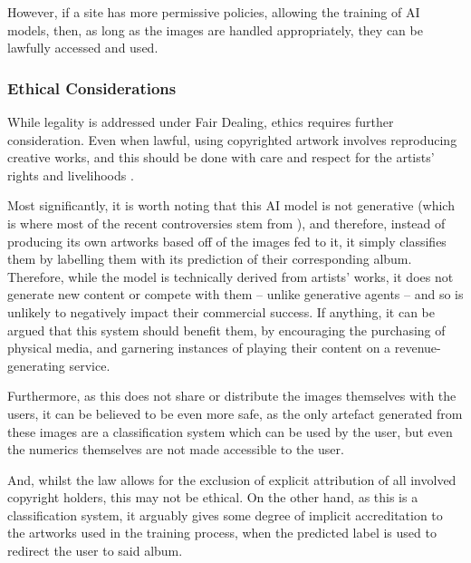                   However, if a site has more permissive policies, allowing the training of AI models, then, as long as the images are handled appropriately, they can be lawfully accessed and used.
    
              \subsubsection{Ethical Considerations}
    
                  While legality is addressed under Fair Dealing, ethics requires further consideration. Even when lawful, using copyrighted artwork involves reproducing creative works, and this should be done with care and respect for the artists' rights and livelihoods \cite{heikkila2022ai_art}.
    
                  Most significantly, it is worth noting that this AI model is not generative (which is where most of the recent controversies stem from \cite{apnews2025mccartney_ai_warning}), and therefore, instead of producing its own artworks based off of the images fed to it, it simply classifies them by labelling them with its prediction of their corresponding album. Therefore, while the model is technically derived from artists' works, it does not generate new content or compete with them -- unlike generative agents \cite{times2025photographer_ai_copy} -- and so is unlikely to negatively impact their commercial success. If anything, it can be argued that this system should benefit them, by encouraging the purchasing of physical media, and garnering instances of playing their content on a revenue-generating service.
    
                  Furthermore, as this does not share or distribute the images themselves with the users, it can be believed to be even more safe, as the only artefact generated from these images are a classification system which can be used by the user, but even the numerics themselves are not made accessible to the user.
    
                  And, whilst the law allows for the exclusion of explicit attribution of all involved copyright holders, this may not be ethical. On the other hand, as this is a classification system, it arguably gives some degree of implicit accreditation to the artworks used in the training process, when the predicted label is used to redirect the user to said album.
    
